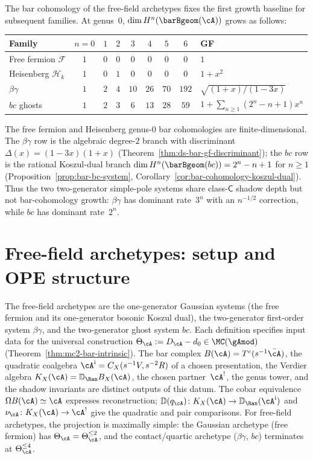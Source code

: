 \begin{remark}
\label{rem:free-field-bar-baseline}
The bar cohomology of the free-field archetypes fixes the first
growth baseline for subsequent families.
At genus~$0$, $\dim H^n(\barBgeom(\cA))$ grows as follows:
\begin{center}
\begin{tabular}{l c c c c c c c l}
\textbf{Family} & $n{=}0$ & $1$ & $2$ & $3$ & $4$ & $5$ & $6$
 & \textbf{GF} \\
\hline
Free fermion $\mathcal{F}$ & $1$ & $0$ & $0$ & $0$ & $0$ & $0$ & $0$
 & $1$ \\
Heisenberg $\mathcal{H}_k$ & $1$ & $0$ & $1$ & $0$ & $0$ & $0$ & $0$
 & $1 + x^2$ \\
$\beta\gamma$ & $1$ & $2$ & $4$ & $10$ & $26$ & $70$ & $192$
 & $\sqrt{(1{+}x)/(1{-}3x)}$ \\
$bc$ ghosts & $1$ & $2$ & $3$ & $6$ & $13$ & $28$ & $59$
 & $1+\sum_{n\geq1}(2^n-n+1)x^n$
\end{tabular}
\end{center}
The free fermion and Heisenberg genus-$0$ bar cohomologies are
finite-dimensional. The $\beta\gamma$ row is the algebraic
degree-$2$ branch with discriminant
$\Delta(x)=(1{-}3x)(1{+}x)$
(Theorem~\ref{thm:ds-bar-gf-discriminant}); the $bc$ row is the
rational Koszul-dual branch
$\dim H^n(\barBgeom(bc))=2^n-n+1$ for $n\ge1$
(Proposition~\ref{prop:bar-bc-system},
Corollary~\ref{cor:bar-cohomology-koszul-dual}). Thus the two
two-generator simple-pole systems share class-$\mathsf C$ shadow
depth but not bar-cohomology growth: $\beta\gamma$ has dominant
rate~$3^n$ with an $n^{-1/2}$ correction, while $bc$ has dominant
rate~$2^n$.
\end{remark}

\section{Free-field archetypes: setup and OPE structure}\label{sec:free-field-atoms-setup}

The free-field archetypes are the one-generator Gaussian systems
(the free fermion and its one-generator bosonic Koszul dual), the
two-generator first-order system $\beta\gamma$, and the two-generator
ghost system $bc$. Each definition specifies input data for the universal construction
$\Theta_\cA := D_\cA - d_0 \in \MC(\gAmod)$
(Theorem~\ref{thm:mc2-bar-intrinsic}). The bar complex
$B(\cA)=T^c(s^{-1}\bar\cA)$, the quadratic coalgebra
$\cA^{\mathrm{i}}=C_X(s^{-1}V,s^{-2}R)$ of a chosen presentation, the
Verdier algebra $K_X(\cA)=\mathbb D_{\Ran}B_X(\cA)$, the chosen
partner~$\cA^!$, the genus tower, and
the shadow invariants are distinct outputs of this datum. The
cobar equivalence $\Omega B(\cA)\simeq \cA$ expresses reconstruction;
$\mathbb D(q_\cA)\colon K_X(\cA)\to\mathbb D_{\Ran}(\cA^{\mathrm i})$
and $\nu_\cA\colon K_X(\cA)\to\cA^!$ give the quadratic and pair
comparisons. For free-field archetypes, the
projection is maximally simple: the Gaussian archetype (free
fermion) has $\Theta_\cA = \Theta_\cA^{\leq 2}$, and the
contact/quartic archetype ($\beta\gamma$, $bc$) terminates at
$\Theta_\cA^{\leq 4}$.

